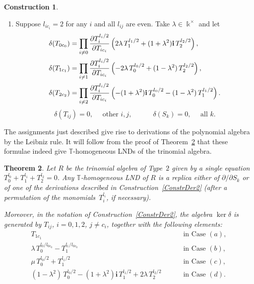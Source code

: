 \documentclass[a4paper,reqno,12pt]{amsart}
\theoremstyle{plain}
\newtheorem{theorem}{Theorem}[section]
\theoremstyle{definition}
\newtheorem{construction}[theorem]{Construction}
\theoremstyle{plain}
\theoremstyle{remark}
\newcommand{\TT}{\mathbb{T}}
\newcommand{\ii}{\mathbf{i}}
\begin{document}
\begin{construction}
\begin{enumerate}
$$        $$
        $$\delta(T_{ij})=0, \quad\mbox{ other $i,j$},\qquad\quad 
                 \delta(S_k) = 0,\quad \text{ all } k.$$
        \item[$(d)$] Suppose $l_{ic_i}=2$ for any $i$ and all $l_{ij}$ are even. Take $\lambda\in\Bbbk^\times$ and let
        \begin{equation*}
            \begin{split}                 \delta(T_{0c_0})&= \prod_{i\neq 0}{\partial T_i^{l_i/2}\over \partial T_{ic_i}}  \left(2\lambda\, T_1^{l_1/2} + (1+\lambda^2)\ii\, T_2^{l_2/2}\right) ,\\ 
            \delta(T_{1c_1})&= \prod_{i\neq 1}{\partial T_i^{l_i/2}\over \partial T_{ic_i}} \left(-2\lambda\, T_0^{l_0/2} + (1-\lambda^2) \,T_2^{l_2/2} \right) ,\\
            \delta(T_{2c_2})&= \prod_{i\neq 2}{\partial T_i^{l_i/2}\over \partial T_{ic_i}} \left(-(1+\lambda^2)\ii\, T_0^{l_0/2} - (1-\lambda^2) \,T_1^{l_1/2} \right).
            \end{split}
        \end{equation*}
       $$\delta(T_{ij})=0, \quad\mbox{ other $i,j$},\qquad\quad 
                 \delta(S_k) = 0,\quad \text{ all } k.$$
    \end{enumerate}
\end{construction}
The assignments just described give rise to derivations of the polynomial algebra by the Leibniz rule. It will follow from the proof of Theorem~\ref{TheoremType2} that these formulae indeed give ${\TT}$-homogeneous LNDs of the trinomial algebra.

\begin{theorem}\label{TheoremType2}
    Let $R$ be the trinomial algebra of Type~$2$ given by a single equation $T_0^{l_0}+T_1^{l_1}+ T_{2}^{l_2}=0$. Any ${\TT}$-homogeneous LND of $R$ is a replica either of ${\partial/\partial S_k}$ or of one of the derivations described in Construction~\ref{ConstrDer2} (after a permutation of the monomials~$T_{i}^{l_i}$, if necessary).

    Moreover, in the notation of Construction~\ref{ConstrDer2}, the algebra $\ker\delta$ is generated by $T_{ij}$, $i=0,1,2$, $j\neq c_i$, together with the following elements:
    \begin{align*}
        T_{1c_1}\qquad &\mbox{ in Case $(a)$},\\
        \lambda\,{ T_0^{l_0/l_{0c_0}}}-{T_{1}^{l_1/l_{0c_0}}}\qquad &\mbox{ in Case $(b)$},\\
        \mu\,{ T_0^{l_0/2}}+{T_{1}^{l_1/2}}\qquad  &\mbox{ in Case $(c)$},\\
        (1-\lambda^2)\, T_{0}^{l_0/2} -(1+\lambda^2)\ii\,{ T_1^{l_1/2}} +2\lambda\, {T_{2}^{l_2/2}}\qquad &\mbox{ in Case $(d)$}.
    \end{align*}
\end{theorem}
\end{document}
